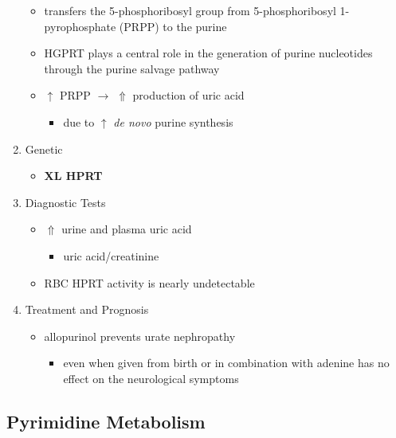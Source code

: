 \documentclass[12pt]{scrartcl}
\begin{document}
\begin{enumerate}

\begin{itemize}
\item transfers the 5-phosphoribosyl group from 5-phosphoribosyl
1-pyrophosphate (PRPP) to the purine
\item HGPRT plays a central role in the generation of purine nucleotides
through the purine salvage pathway
\item \(\uparrow\) PRPP \(\to\) \(\Uparrow\) production of uric acid
\begin{itemize}
\item due to \(\uparrow\) \emph{de novo} purine synthesis
\end{itemize}
\end{itemize}

\item Genetic
\label{sec:org0309e30}
\begin{itemize}
\item \textbf{XL HPRT}
\end{itemize}

\item Diagnostic Tests
\label{sec:org425431c}
\begin{itemize}
\item \(\Uparrow\) urine and plasma uric acid
\begin{itemize}
\item uric acid/creatinine
\end{itemize}
\item RBC HPRT activity is nearly undetectable
\end{itemize}

\item Treatment and Prognosis
\label{sec:orgcf80e98}
\begin{itemize}
\item allopurinol prevents urate nephropathy
\begin{itemize}
\item even when given from birth or in combination with adenine has no
effect on the neurological symptoms
\end{itemize}
\end{itemize}
\end{enumerate}

\subsection{Pyrimidine Metabolism}
\label{sec:org599a1f2}
\end{document}
